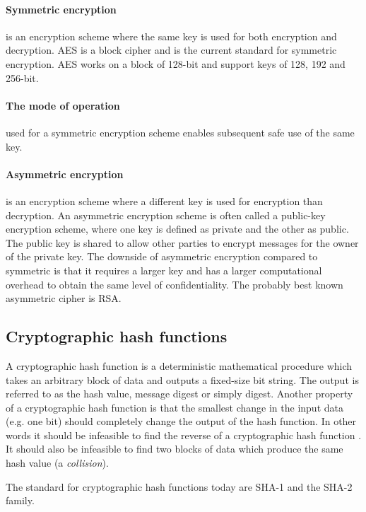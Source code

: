 \documentclass[english,12pt,a4paper]{book}
\begin{document}
\paragraph{Symmetric encryption} is an encryption scheme where the same key is
used for both encryption and decryption\cite[p. 32]{stallings}. \ac{AES} is a
block cipher and is the current standard for symmetric encryption. \ac{AES}
works on a block of 128-bit and support keys of 128, 192 and 256-bit. 

\paragraph{The mode of operation} used for a symmetric encryption scheme
enables subsequent safe use of the same key.

\paragraph{Asymmetric encryption} is an encryption scheme where a different key
is used for encryption than decryption\cite[p. 259]{stallings}. An asymmetric
encryption scheme is often called a public-key encryption scheme, where one key
is defined as private and the other as public. The public key is shared to
allow other parties to encrypt messages for the owner of the private key. The
downside of asymmetric encryption compared to symmetric is that it requires a
larger key and has a larger computational overhead to obtain the same level of
confidentiality. The probably best known asymmetric cipher is \ac{RSA}.

\subsection{Cryptographic hash functions}
A cryptographic hash function is a deterministic mathematical procedure which
takes an arbitrary block of data and outputs a fixed-size bit string. The output
is referred to as the hash value, message digest or simply digest.
Another property of a cryptographic hash function is that the smallest change in
the input data (e.g. one bit) should completely change the output of the hash
function. In other words it should be infeasible to find the reverse of a
cryptographic hash function \cite[p. 335]{stallings}. It should also be infeasible to
find two blocks of data which produce the same hash value (a \emph{collision}).

The standard for cryptographic hash functions today are \ac{SHA}-1 and the
\ac{SHA}-2 family.
\end{document}
